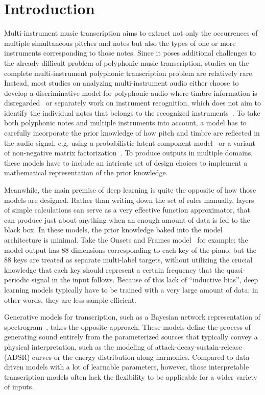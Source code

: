 \section{Introduction}

Multi-instrument music transcription aims to extract not only the occurrences of multiple simultaneous pitches and notes but also the types of one or more instruments corresponding to those notes.
Since it poses additional challenges to the already difficult problem of polyphonic music transcription, studies on the complete multi-instrument polyphonic transcription problem are relatively rare.
Instead, most studies on analyzing multi-instrument audio either choose to develop a discriminative model for polyphonic audio where timbre information is disregarded~\cite{bittner2017deepsalience,zhang2018particle}
or separately work on instrument recognition, which does not aim to identify the individual notes that belongs to the recognized instruments~\cite{agostini2003timbres,lostanlen2016spiral}.
To take both polyphonic notes and multiple instruments into account, a model has to carefully incorporate the prior knowledge of how pitch and timbre are reflected in the audio signal, e.g. using a probabilistic latent component model~\cite{benetos2015probabilistic} or a variant of non-negative matrix factorization~\cite{grindlay2009eigeninstruments}.
To produce outputs in multiple domains, these models have to include an intricate set of design choices to implement a mathematical representation of the prior knowledge.

Meanwhile, the main premise of deep learning is quite the opposite of how those models are designed.
Rather than writing down the set of rules manually, layers of simple calculations can serve as a very effective function approximator, that can produce just about anything when an enough amount of data is fed to the black box.
In these models, the prior knowledge baked into the model architecture is minimal.
Take the Onsets and Frames model~\cite{hawthorne2018onsetsframes} for example; the model output has 88 dimensions corresponding to each key of the piano, but the 88 keys are treated as separate multi-label targets, without utilizing the crucial knowledge that each key should represent a certain frequency that the quasi-periodic signal in the input follows.
Because of this lack of ``inductive bias'', deep learning models typically have to be trained with a very large amount of data; in other words, they are less sample efficient.


Generative models for transcription, such as a Bayesian network representation of spectrogram~\cite{bergkirkpatrick2014unsupervised}, takes the opposite approach.
These models define the process of generating sound entirely from the parameterized sources that typically convey a physical interpretation, such as the modeling of attack-decay-sustain-release (ADSR) curves or the energy distribution along harmonics. 
Compared to data-driven models with a lot of learnable parameters, however, those interpretable transcription models often lack the flexibility to be applicable for a wider variety of inputs.

